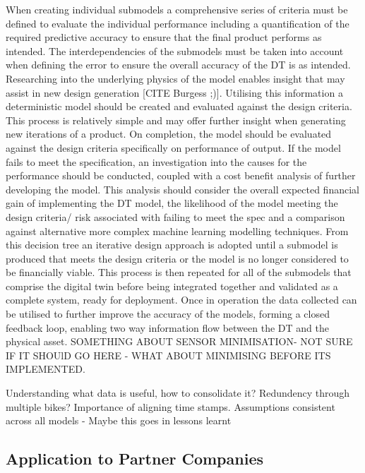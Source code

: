 \documentclass[a4paper, 10pt]{article}
\numberwithin{equation}{section}
\begin{document}
When creating individual submodels a comprehensive series of criteria must be defined to evaluate the individual performance including a quantification of the required predictive accuracy to ensure that the final product performs as intended. The interdependencies of the submodels must be taken into account when defining the error to ensure the overall accuracy of the DT is as intended. Researching into the underlying physics of the model enables insight that may assist in new design generation [CITE Burgess ;)]. Utilising this information a deterministic model should be created and evaluated against the design criteria. This process is relatively simple and may offer further insight when generating new iterations of a product. On completion, the model should be evaluated against the design criteria specifically on performance of output. If the model fails to meet the specification, an investigation into the causes for the performance should be conducted, coupled with a cost benefit analysis of further developing the model. This analysis should consider the overall expected financial gain of implementing the DT model, the likelihood of the model meeting the design criteria/ risk associated with failing to meet the spec and a comparison against alternative more complex machine learning modelling techniques. From this decision tree an iterative design approach is adopted until a submodel is produced that meets the design criteria or the model is no longer considered to be financially viable. This process is then repeated for all of the submodels that comprise the digital twin before being integrated together and validated as a complete system, ready for deployment. Once in operation the data collected can be utilised to further improve the accuracy of the models, forming a closed feedback loop, enabling two way information flow between the DT and the physical asset. SOMETHING ABOUT SENSOR MINIMISATION- NOT SURE IF IT SHOUlD GO HERE - WHAT ABOUT MINIMISING BEFORE ITS IMPLEMENTED. 


Understanding what data is useful, how to consolidate it? 
Redundency through multiple bikes?
Importance of aligning time stamps. 
Assumptions consistent across all models - Maybe this goes in lessons learnt



\subsection{Application to Partner Companies}
\end{document}
